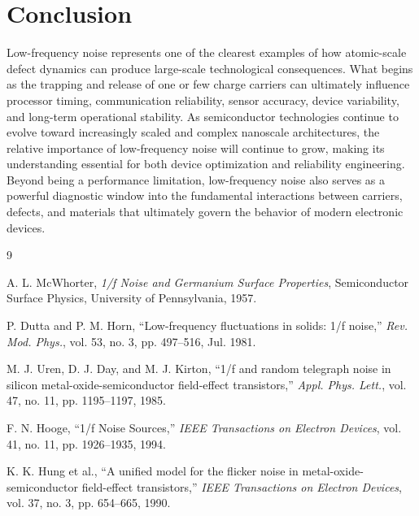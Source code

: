 \documentclass[10pt,a4paper]{article}
\begin{document}
	\section{Conclusion}
	
	Low-frequency noise represents one of the clearest examples of how atomic-scale defect dynamics can produce large-scale technological consequences. What begins as the trapping and release of one or few charge carriers can ultimately influence processor timing, communication reliability, sensor accuracy, device variability, and long-term operational stability. As semiconductor technologies continue to evolve toward increasingly scaled and complex nanoscale architectures, the relative importance of low-frequency noise will continue to grow, making its understanding essential for both device optimization and reliability engineering. Beyond being a performance limitation, low-frequency noise also serves as a powerful diagnostic window into the fundamental interactions between carriers, defects, and materials that ultimately govern the behavior of modern electronic devices.
	
	
	\begin{thebibliography}{9}
		
		A. L. McWhorter,
		\textit{1/f Noise and Germanium Surface Properties},
		Semiconductor Surface Physics,
		University of Pennsylvania,
		1957.
		
		P. Dutta and P. M. Horn,
		``Low-frequency fluctuations in solids: 1/f noise,''
		\textit{Rev. Mod. Phys.},
		vol. 53,
		no. 3,
		pp. 497--516,
		Jul. 1981.
		
		M. J. Uren, D. J. Day, and M. J. Kirton,
		``1/f and random telegraph noise in silicon metal-oxide-semiconductor field-effect transistors,''
		\textit{Appl. Phys. Lett.},
		vol. 47,
		no. 11,
		pp. 1195--1197,
		1985.
		
		F. N. Hooge,
		``1/f Noise Sources,''
		\textit{IEEE Transactions on Electron Devices},
		vol. 41,
		no. 11,
		pp. 1926--1935,
		1994.
		
		K. K. Hung et al.,
		``A unified model for the flicker noise in metal-oxide-semiconductor field-effect transistors,''
		\textit{IEEE Transactions on Electron Devices},
		vol. 37,
		no. 3,
		pp. 654--665,
		1990.
		
	\end{thebibliography}
	
\end{document}
